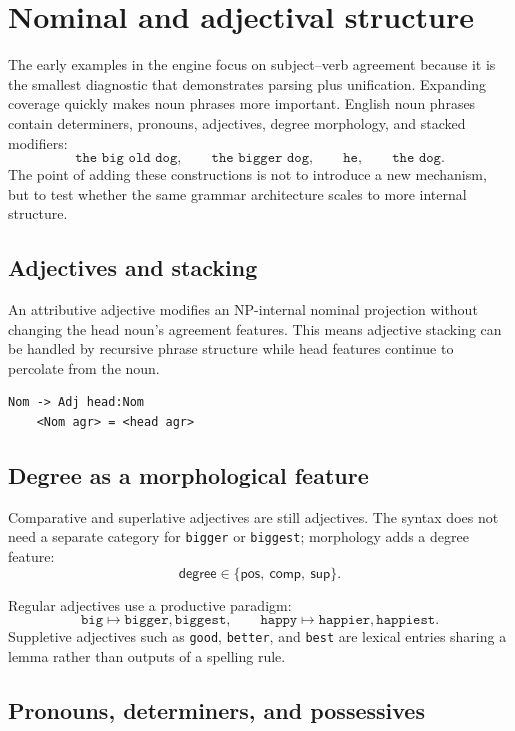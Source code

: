 \documentclass[11pt]{article}
\theoremstyle{definition}
\theoremstyle{plain}
\theoremstyle{remark}
\begin{document}
\section{Nominal and adjectival structure}

The early examples in the engine focus on subject--verb agreement because it is
the smallest diagnostic that demonstrates parsing plus unification. Expanding
coverage quickly makes noun phrases more important. English noun phrases contain
determiners, pronouns, adjectives, degree morphology, and stacked modifiers:
\[
  \texttt{the big old dog}, \qquad
  \texttt{the bigger dog}, \qquad
  \texttt{he}, \qquad
  \texttt{the dog}.
\]
The point of adding these constructions is not to introduce a new mechanism, but
to test whether the same grammar architecture scales to more internal structure.

\subsection{Adjectives and stacking}

An attributive adjective modifies an NP-internal nominal projection without
changing the head noun's agreement features. This means adjective stacking can
be handled by recursive phrase structure while head features continue to
percolate from the noun.

\begin{lstlisting}[language=gram]
Nom -> Adj head:Nom
    <Nom agr> = <head agr>
\end{lstlisting}

\subsection{Degree as a morphological feature}

Comparative and superlative adjectives are still adjectives. The syntax does not
need a separate category for \texttt{bigger} or \texttt{biggest}; morphology
adds a degree feature:
\[
  \textsf{degree} \in \{\textsf{pos},\ \textsf{comp},\ \textsf{sup}\}.
\]

Regular adjectives use a productive paradigm:
\[
  \texttt{big} \mapsto \texttt{bigger}, \texttt{biggest},
  \qquad
  \texttt{happy} \mapsto \texttt{happier}, \texttt{happiest}.
\]
Suppletive adjectives such as \texttt{good}, \texttt{better}, and \texttt{best}
are lexical entries sharing a lemma rather than outputs of a spelling rule.

\subsection{Pronouns, determiners, and possessives}
\end{document}
